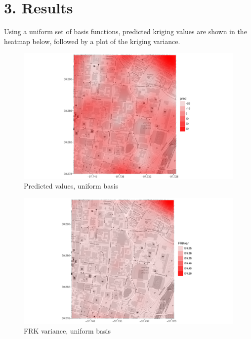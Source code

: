 \documentclass[11pt]{article}
\begin{document}
\newpage
\section{3. Results}

Using a uniform set of basis functions, predicted kriging values are shown in the heatmap below, followed by a plot of the kriging variance. \\

\begin{figure}[h!]
\centering
\includegraphics[width=160mm,keepaspectratio]{Images/pred.pdf}
\caption{Predicted values, uniform basis \label{fig:4}}
\end{figure}

\begin{figure}[h!]
\centering
\includegraphics[width=160mm,keepaspectratio]{Images/var.pdf}
\caption{FRK variance, uniform basis \label{fig:5}}
\end{figure}
\end{document}
